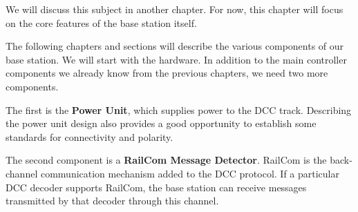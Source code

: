 We will discuss this subject in another chapter. For now, this chapter will focus on the core 
features of the base station itself.


The following chapters and sections will describe the various components of our base station. 
We will start with the hardware. 
In addition to the main controller components we already know from the previous chapters, we 
need two more components.

The first is the \textbf{Power Unit}, which supplies power to the DCC track. Describing the 
power unit design also provides a good opportunity to establish some standards for connectivity 
and polarity.

The second component is a \textbf{RailCom Message Detector}. RailCom is the back-channel 
communication mechanism added to the DCC protocol. If a particular DCC decoder supports RailCom, 
the base station can receive messages transmitted by that decoder through this channel.

